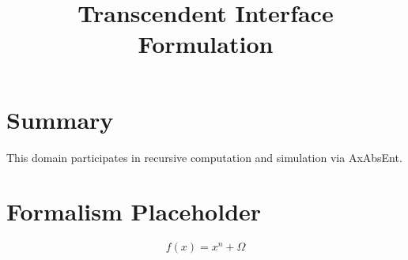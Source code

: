 \documentclass[12pt]{article}
\title{\textbf{Transcendent Interface Formulation}}
\begin{document}
\maketitle

\section*{Summary}
This domain participates in recursive computation and simulation via AxAbsEnt.

\section*{Formalism Placeholder}
\[
f(x) = x^n + \Omega
\]
\end{document}
